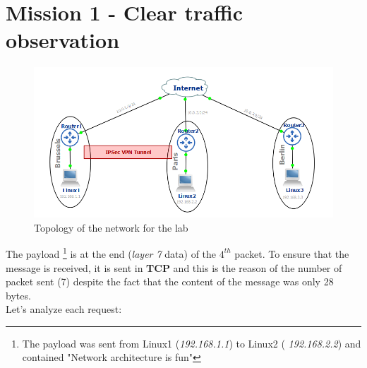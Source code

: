 \documentclass[10pt,a4paper]{ULBreport}
\begin{document}
 



\chapter{Mission 1 - Clear traffic observation}

\begin{figure}[H]
    \centering
    \includegraphics{Images/topology.png}
    \caption{Topology of the network for the lab}
    \label{img:topology}
\end{figure}




The payload \footnote{The payload was sent from Linux1 (\textit{192.168.1.1}) to Linux2 (\textit{
192.168.2.2}) and contained "Network architecture is fun"} is at the end (\textit{layer 7} data) of the $4^{th}$ 
packet. To ensure that the message is received, 
it is sent in \textbf{TCP} and this is the reason of the number of packet sent (7) despite 
the fact that the content of the message was only 28 bytes.\\
Let's analyze each request:
\end{document}

